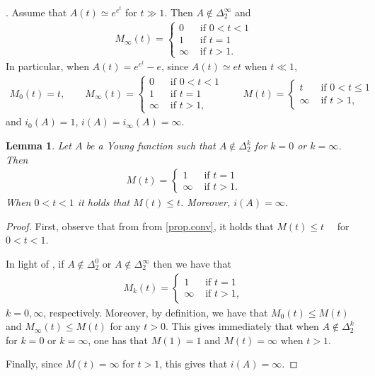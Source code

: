 \documentclass[12pt,reqno]{amsart}
\newtheorem{lem}[thm]{Lemma}
\theoremstyle{definition}
\theoremstyle{remark}
\numberwithin{equation}{section}
\begin{document}
. Assume that $A(t)\simeq e^{e^t}$  for $t\gg1$. Then $A\notin \Delta_2^\infty$ and 
\begin{align*}
M_\infty(t)=
\begin{cases}
0 & \text{ if } 0<t<1\\
1 & \text{ if } t=1\\
\infty &\text{ if } t>1.
\end{cases}
\end{align*}
In particular, when $A(t)=e^{e^t}- e$, since $A(t)\simeq et$ when $t\ll1$, 
\begin{align*}
M_0(t)=t, \qquad 
M_\infty(t)=
\begin{cases}
0 & \text{ if } 0<t<1\\
1 & \text{ if } t=1\\
\infty &\text{ if } t>1,
\end{cases}
\qquad 
M(t)=
\begin{cases}
t & \text{ if } 0<t\leq 1\\
\infty &\text{ if } t>1,
\end{cases}
\end{align*}
and $i_0(A)=1$, $i(A)=i_\infty(A)=\infty$.

 
\begin{lem} \label{lema.m}
Let $A$ be a Young function such that $A\notin \Delta_2^k$ for $k=0$ or $k=\infty$. Then 
\begin{align*}
M(t)=
\begin{cases}
1 & \text{ if } t= 1\\
\infty & \text{ if } t>1.
\end{cases}
\end{align*}
When $0<t<1$ it holds that $M(t)\leq t$. Moreover, $i(A)=\infty$.
\end{lem}
\begin{proof}
First, observe that from from \eqref{prop.conv}, it holds that $M(t) \leq t\quad$  for  $0<t<1$.

In light of \cite[Proposition 2.1]{fbs.autov}, if $A\notin \Delta_2^0$ or $A\notin \Delta_2^\infty$ then we have that
\begin{align*}
M_k(t)=
\begin{cases}
1 & \text{ if } t=1\\
\infty & \text{ if } t>1,
\end{cases}
\end{align*}
$k=0,\infty$, respectively. Moreover, by definition, we have that $M_0(t)\leq M(t)$ and  $M_\infty(t)\leq M(t)$ for any $t>0$. This gives immediately that when $A\notin \Delta_2^k$ for $k=0$ or $k=\infty$, one has that $M(1)=1$ and $M(t)=\infty$ when $t>1$. 

\noindent Finally, since $M(t)=\infty$ for $t>1$, this gives that $i(A)=\infty$.
\end{proof}
\end{document}
